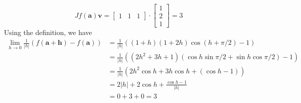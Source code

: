 \documentclass{article}
\begin{document}
\begin{equation*}
    Jf(\mathbf{a})\mathbf{v} = \begin{bmatrix}
        1& 1& 1
    \end{bmatrix}\cdot \begin{bmatrix}
        1\\
        2\\
        1
    \end{bmatrix} = 3
\end{equation*}
Using the definition, we have 
\begin{equation*}
    \begin{split}
        \lim_{h\rightarrow 0}\frac{1}{|h|}\left(
            f(\mathbf{a+h}) - f(\mathbf{a})
        \right) &= \frac{1}{|h|}((1+h)(1+2h)\cos (h+\pi/2) - 1)\\
        &= \frac{1}{|h|}((2h^2+3h+1)(\cos h\sin \pi/2 + \sin h\cos \pi/2) - 1)\\
        &= \frac{1}{|h|}(2h^2 \cos h + 3h\cos h + (\cos h - 1))\\
        &= 2|h| + 2\cos h + \frac{\cos h-1}{|h|}\\
        &= 0 + 3 + 0 = 3
    \end{split}
\end{equation*}
\end{document}
